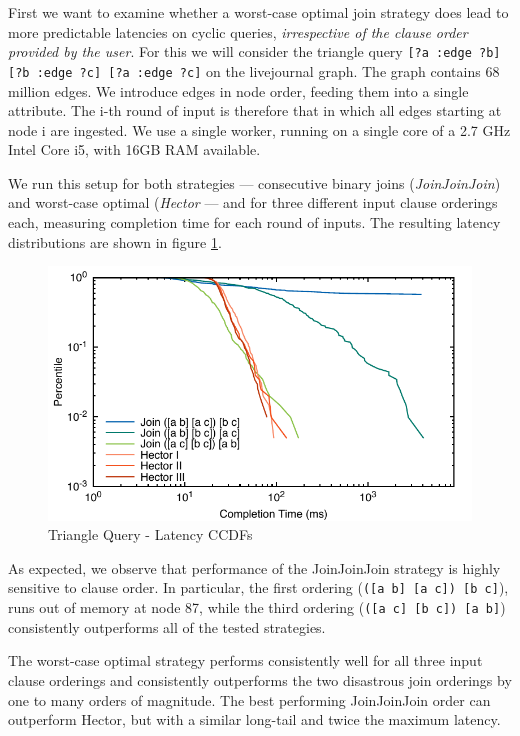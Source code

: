 \documentclass[../catalog.tex]{subfiles}
\begin{document}
First we want to examine whether a worst-case optimal join strategy
does lead to more predictable latencies on cyclic queries,
\emph{irrespective of the clause order provided by the user}. For this
we will consider the triangle query \texttt{[?a :edge ?b] [?b :edge
    ?c] [?a :edge ?c]} on the livejournal graph. The graph contains 68
million edges. We introduce edges in node order, feeding them into a
single attribute. The i-th round of input is therefore that in which
all edges starting at node i are ingested. We use a single worker,
running on a single core of a 2.7 GHz Intel Core i5, with 16GB RAM
available.

We run this setup for both strategies — consecutive binary joins
(\emph{JoinJoinJoin}) and worst-case optimal (\emph{Hector} — and for
three different input clause orderings each, measuring completion time
for each round of inputs. The resulting latency distributions are
shown in figure \ref{fig:triangle-cdfs}.

\begin{figure}[h!]
  \includegraphics[width=1.0\linewidth]{results/triangles/out/all_cdfs}
  \caption{Triangle Query - Latency CCDFs}
  \label{fig:triangle-cdfs}
\end{figure}

As expected, we observe that performance of the JoinJoinJoin strategy
is highly sensitive to clause order. In particular, the first ordering
(\texttt{([a b] [a c]) [b c]}), runs out of memory at node 87, while
the third ordering (\texttt{([a c] [b c]) [a b]}) consistently
outperforms all of the tested strategies.

The worst-case optimal strategy performs consistently well for all
three input clause orderings and consistently outperforms the two
disastrous join orderings by one to many orders of magnitude. The best
performing JoinJoinJoin order can outperform Hector, but with a
similar long-tail and twice the maximum latency.
\end{document}
